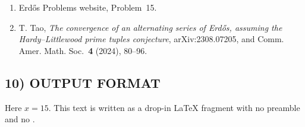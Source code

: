 \begin{enumerate}
\item[{[EP]}] Erd\H{o}s Problems website, Problem~15.

\item[{[Ta23]}] T. Tao,
\emph{The convergence of an alternating series of Erd\H{o}s, assuming the Hardy--Littlewood prime tuples conjecture},
arXiv:2308.07205, and Comm. Amer. Math. Soc.\ \textbf{4} (2024), 80--96.
\end{enumerate}

\subsection*{10) OUTPUT FORMAT}

Here \(x=15\).
This text is written as a drop-in \LaTeX{} fragment with no preamble and no \verb||.
